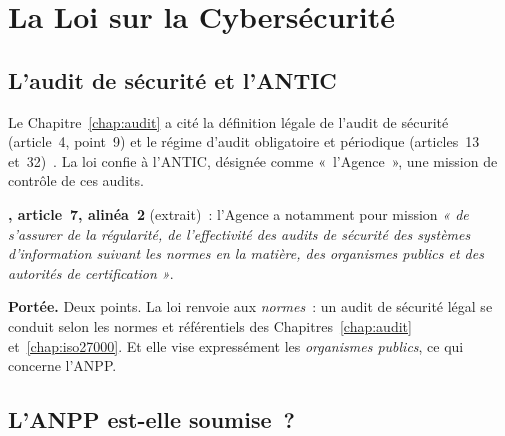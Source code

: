 \section{La Loi sur la Cybersécurité}
\label{sec:c10-2010}

\subsection{L'audit de sécurité et l'ANTIC}

Le Chapitre~\ref{chap:audit} a cité la définition légale de l'audit de
sécurité (article~4, point~9) et le régime d'audit obligatoire et
périodique (articles~13 et~32)~\cite{loi2010012}. La loi confie à l'ANTIC,
désignée comme «~l'Agence~», une mission de contrôle de ces audits.

\begin{boxjuris}
\textbf{, article~7, alinéa~2} (extrait)~: l'Agence a
notamment pour mission \textit{« de s'assurer de la régularité, de
l'effectivité des audits de sécurité des systèmes d'information suivant
les normes en la matière, des organismes publics et des autorités de
certification »}.

\medskip
\textbf{Portée.} Deux points. La loi renvoie aux \emph{normes}~: un audit
de sécurité légal se conduit selon les normes et référentiels des
Chapitres~\ref{chap:audit} et~\ref{chap:iso27000}. Et elle vise
expressément les \emph{organismes publics}, ce qui concerne l'ANPP.
\end{boxjuris}

\subsection{L'ANPP est-elle soumise~?}

